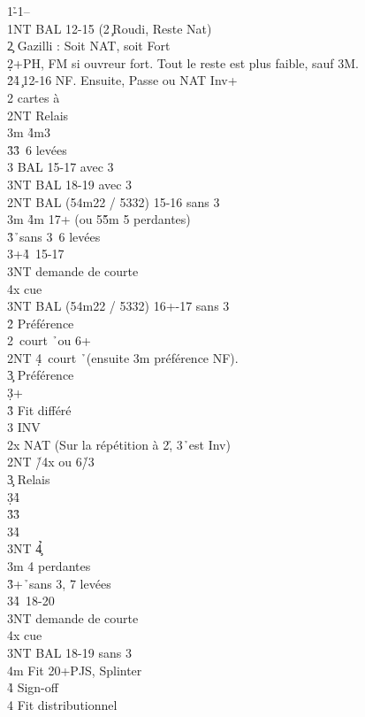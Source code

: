 \documentclass[a4paper]{article}
\begin{document}
\begin{bidtable}
1\h-1\s--\\
1NT \> BAL 12-15 (2\c\ Roudi, Reste Nat)\\
2\c \> Gazilli : Soit NAT, soit Fort\+\\
2\d {}+PH, FM si ouvreur fort. Tout le reste est plus faible, sauf 3M.\+\\
2\h {}\h 4\c\ 12-16 NF. Ensuite, Passe ou NAT Inv+\\
2\s {} cartes à \s \+\\
2NT \> Relais\+\\
3m \h 4m3\s \\
3\h {}\h 3\s\ 6 levées\\
3\s \> BAL 15-17 avec 3\s \\
3NT \> BAL 18-19 avec 3\s \-\-\\
2NT \> BAL (54m22 / 5332) 15-16 sans 3\s \\
3m \h 4m 17+ (ou 5\h 5m 5 perdantes)\\
3\h {}\h\ sans 3\s\ 6 levées\\
3\s {}+\h 4\s\ 15-17\+\\
3NT \> demande de courte\\
4x \> cue\-\\
3NT \> BAL (54m22 / 5332) 16+-17 sans 3\s \-\\
2\h \> Préférence\\
2\s {}\s\ court \h\ ou 6+\s \\
2NT \d 4\s\ court \h\ (ensuite 3m préférence NF).\\
3\c \> Préférence\\
3\d {}+\d \\
3\h \> Fit différé\\
3\s \> INV\-\\
2x \> NAT (Sur la répétition à 2\h , 3\h\ est Inv)\\
2NT \h /4x ou 6\h /3\s \+\\
3\c \> Relais\+\\
3\d {}\h 4\d \\
3\h {}\h 3\s \\
3\s {}\h 4\s \\
3NT \h 4\c \-\-\\
3m  4 perdantes\\
3\h {}+\h\ sans 3\s , 7 levées\\
3\s {}\h 4\s\ 18-20\+\\
3NT \> demande de courte\\
4x \> cue\-\\
3NT \> BAL 18-19 sans 3\s \\
4m \> Fit 20+PJS, Splinter\\
4\h \> Sign-off\\
4\s \> Fit distributionnel
\end{bidtable}
\end{document}

